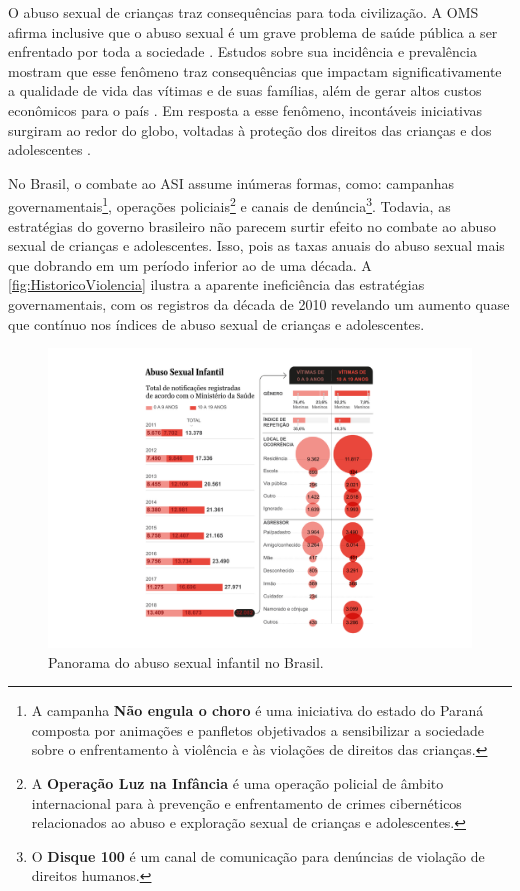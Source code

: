 O abuso sexual de crianças traz consequências para toda civilização. A \ac{OMS} afirma inclusive que o abuso sexual é um grave problema de saúde pública a ser enfrentado por toda a sociedade \cite{OMS2017responding}. Estudos sobre sua incidência e prevalência mostram que esse fenômeno traz consequências que impactam significativamente a qualidade de vida das vítimas e de suas famílias, além de gerar altos custos econômicos para o país \cite{pinto2017avaliaccao}. Em resposta a esse fenômeno, incontáveis iniciativas surgiram ao redor do globo, voltadas à proteção dos direitos das crianças e dos adolescentes \cite{finkelhor2009prevention}.

No Brasil, o combate ao \ac{ASI} assume inúmeras formas, como: campanhas governamentais\footnote{A campanha \textbf{Não engula o choro} é uma iniciativa do estado do Paraná composta por animações e panfletos objetivados a sensibilizar a sociedade sobre o enfrentamento à violência e às violações de direitos das crianças.}, operações policiais\footnote{A \textbf{Operação Luz na Infância} é uma operação policial de âmbito internacional para à prevenção e enfrentamento de crimes cibernéticos relacionados ao abuso e exploração sexual de crianças e adolescentes.} e canais de denúncia\footnote{O \textbf{Disque 100} é um canal de comunicação para denúncias de violação de direitos humanos.}. Todavia, as estratégias do governo brasileiro não parecem surtir efeito no combate ao abuso sexual de crianças e adolescentes. Isso, pois as taxas anuais do abuso sexual mais que dobrando em um período inferior ao de uma década. A \autoref{fig:HistoricoViolencia} ilustra a aparente ineficiência das estratégias governamentais, com os registros da década de 2010 revelando um aumento quase que contínuo nos índices de abuso sexual de crianças e adolescentes.

\begin{figure}[!t]
	\caption{Panorama do abuso sexual infantil no Brasil.}\label{fig:HistoricoViolencia}
    \hspace{-4.8 cm}
    \includegraphics[width=1.6\linewidth]{./Visuais/HistoricoViolencia.pdf}
  	\vspace{-1.0cm}
\end{figure}

